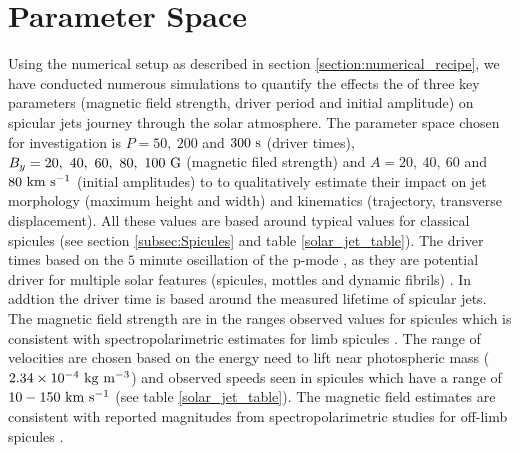 \documentclass[12pt]{ociamthesis}
\newcommand{\kms}{~\rm{km ~s^{-1}}}
\newcommand{\np}{\\ \\}
\begin{document}
\section{Parameter Space}
\label{subsec:paramater_space}
Using the numerical setup as described in section \ref{section:numerical_recipe}, we have conducted numerous simulations to quantify the effects the of three key parameters (magnetic field strength, driver period and initial amplitude) on spicular jets journey through the solar atmosphere. The parameter space chosen for investigation is $P=50,~200$ and $300~\rm{s}$ (driver times), $B_y=20,~40,~60,~80,~100~\rm{G}$ (magnetic filed strength) and $A=20,~40,~60$ and $80 \kms$ (initial amplitudes) to to qualitatively estimate their impact on jet morphology (maximum height and width) and kinematics (trajectory, transverse displacement). All these values are based around typical values for classical spicules (see section \ref{subsec:Spicules} and table \ref{solar_jet_table}). The driver times based on the $5$ minute oscillation of the p-mode \citep{Leighton1962ApJ135474L}, as they are potential driver for multiple solar features (spicules, mottles  and dynamic fibrils) \citep{Pontieu2004Natur}. In addtion the driver time is based around the measured lifetime of spicular jets. The magnetic field strength are in the ranges observed values for spicules which is consistent with spectropolarimetric estimates for limb spicules \citep{centeno2010, suarez2015}. The range of velocities are chosen based on the energy need to lift near photospheric mass ($2.34\times10^{-4}~\rm{kg~m^{-3}}$) and observed speeds seen in spicules which have a range of $10-150\kms$ (see table \ref{solar_jet_table}). The magnetic field estimates are consistent with reported magnitudes from spectropolarimetric studies for off-limb spicules \citep{centeno2010, suarez2015}. \np
\end{document}
